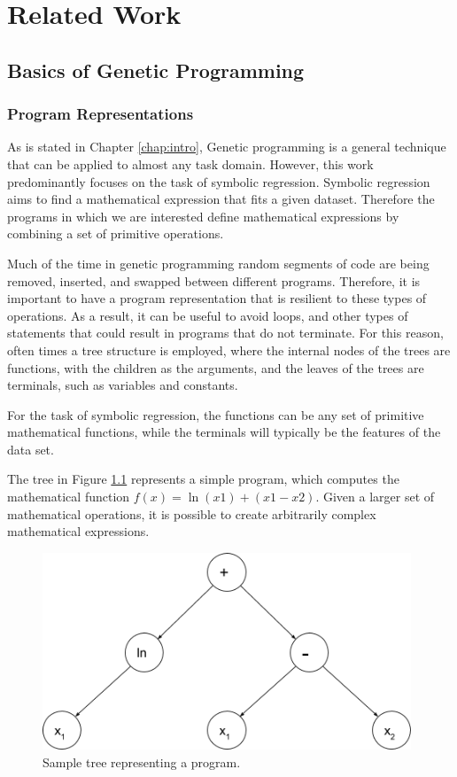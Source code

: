 \chapter{Related Work}
\label{chap:relatedwork}
\section{Basics of Genetic Programming}
\subsection{Program Representations}
As is stated in Chapter \ref{chap:intro}, Genetic programming is a general technique that can be applied to almost any task domain.  However, this work predominantly focuses on the task of symbolic regression.  Symbolic regression aims to find a mathematical expression that fits a given dataset.  Therefore the programs in which we are interested define mathematical expressions by combining a set of primitive operations.

Much of the time in genetic programming random segments of code are being removed, inserted, and swapped between different programs.  Therefore, it is important to have a program representation that is resilient to these types of operations.  As a result, it can be useful to avoid loops, and other types of statements that could result in programs that do not terminate.  For this reason, often times a tree structure is employed, where the internal nodes of the trees are functions, with the children as the arguments, and the leaves of the trees are terminals, such as variables and constants.

For the task of symbolic regression, the functions can be any set of primitive mathematical functions, while the terminals will typically be the features of the data set.

The tree in Figure \ref{figure:gp_tree} represents a simple program, which computes the mathematical function $f(x) = \ln(x1) + (x1 - x2)$.  Given a larger set of mathematical operations, it is possible to create arbitrarily complex mathematical expressions.

\noindent
\begin{figure}[h]
\centering
\includegraphics[width=110mm]{gp_tree_colorless}
\caption{Sample tree representing a program.}
\label{figure:gp_tree}
\end{figure}

